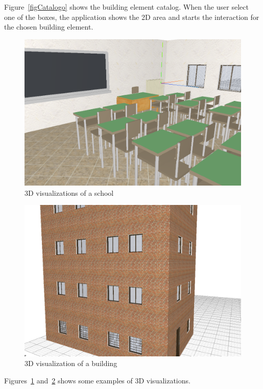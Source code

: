 Figure~\ref{figCatalogo} shows the building element catalog. When the user select one of the boxes, the application shows the 2D area and starts the interaction for the chosen building element.

\begin{figure}[htb]
\centering
\includegraphics[width=\linewidth]{contents/images/3d-school}
\caption{3D visualizations of a school}
\label{fig3D-school}
\end{figure}

\begin{figure}[htb]
\centering
\includegraphics[width=0.7\linewidth]{contents/images/palazzo2}
\caption{3D visualization of a building}
\label{fig3D-palace}
\end{figure}

Figures~\ref{fig3D-school} and~\ref{fig3D-palace} shows some examples of 3D visualizations.
